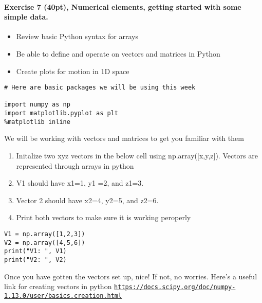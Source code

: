 \documentclass[%
oneside,                 %
final,                   %
10pt]{article}
\begin{document}
\noindent
\paragraph{Exercise 7 (40pt), Numerical elements, getting started with some simple data.}
\begin{itemize}
\item Review basic Python syntax for arrays

\item Be able to define and operate on vectors and matrices in Python

\item Create plots for motion in 1D space
\end{itemize}

\noindent
\begin{verbatim}
# Here are basic packages we will be using this week

import numpy as np 
import matplotlib.pyplot as plt
%matplotlib inline
\end{verbatim}

We will be working with vectors and matrices to get you familiar with them

\begin{enumerate}
\item Initalize two xyz vectors in the below cell using np.array([x,y,z]). Vectors are represented through arrays in python

\item V1 should have x1=1, y1 =2, and z1=3. 

\item Vector 2 should have x2=4, y2=5,  and z2=6. 

\item Print both vectors to make sure it is working peroperly
\end{enumerate}

\noindent
\begin{verbatim}
V1 = np.array([1,2,3])
V2 = np.array([4,5,6])
print("V1: ", V1)
print("V2: ", V2)
\end{verbatim}

Once you have gotten the vectors set up, nice! If not, no worries. Here's a useful link for creating vectors in python \href{{https://docs.scipy.org/doc/numpy-1.13.0/user/basics.creation.html}}{\nolinkurl{https://docs.scipy.org/doc/numpy-1.13.0/user/basics.creation.html}}
\end{document}
